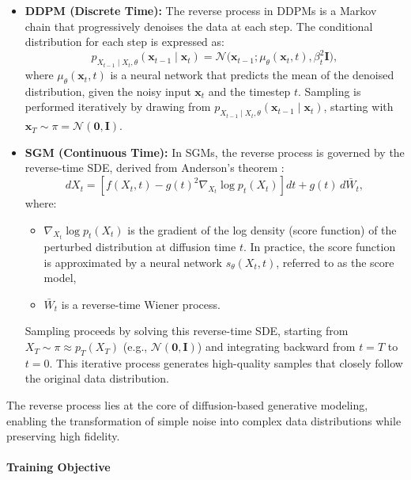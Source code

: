 \begin{itemize}
    \item \textbf{DDPM (Discrete Time):}
    The reverse process in DDPMs is a Markov chain that progressively denoises the data at each step. The conditional distribution for each step is expressed as:
    \[
    p_{X_{t-1} \mid X_t, \theta}(\mathbf{x}_{t-1} \mid \mathbf{x}_t) = \mathcal{N}\bigl(\mathbf{x}_{t-1}; \mu_\theta(\mathbf{x}_t, t), \beta_t^2 \mathbf{I}\bigr),
    \]
    where \( \mu_\theta(\mathbf{x}_t, t) \) is a neural network that predicts the mean of the denoised distribution, given the noisy input \( \mathbf{x}_t \) and the timestep \( t \). Sampling is performed iteratively by drawing from \( p_{X_{t-1} \mid X_t, \theta}(\mathbf{x}_{t-1} \mid \mathbf{x}_t) \), starting with \( \mathbf{x}_T \sim \pi = \mathcal{N}(\mathbf{0}, \mathbf{I}) \).
    \item \textbf{SGM (Continuous Time):}
    In SGMs, the reverse process is governed by the reverse-time SDE, derived from Anderson’s theorem \cite{anderson1982reverse_time_sde}:
    \[
    dX_t = \left[f(X_t, t) - g(t)^2 \nabla_{X_t} \log p_t(X_t)\right] dt + g(t) \, d\bar{W}_t,
    \]
    where:
    \begin{itemize}
        \item \( \nabla_{X_t} \log p_t(X_t) \) is the gradient of the log density (score function) of the perturbed distribution at diffusion time \( t \). In practice, the score function is approximated by a neural network \( s_\theta(X_t, t) \), referred to as the score model,
        \item \( \bar{W}_t \) is a reverse-time Wiener process.
    \end{itemize}

    Sampling proceeds by solving this reverse-time SDE, starting from \( X_T \sim \pi \approx p_T(X_T) \) (e.g., \( \mathcal{N}(\mathbf{0}, \mathbf{I}) \)) and integrating backward from \( t = T \) to \( t = 0 \). This iterative process generates high-quality samples that closely follow the original data distribution.

\end{itemize}

The reverse process lies at the core of diffusion-based generative modeling, enabling the transformation of simple noise into complex data distributions while preserving high fidelity.


\paragraph{Training Objective}

